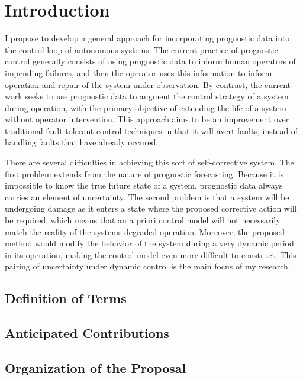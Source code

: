 \section{Introduction}
I propose to develop a general approach for incorporating prognostic
data into the control loop of autonomous systems.  The current
practice of prognostic control generally consists of using prognostic
data to inform human operators of impending failures, and then the
operator uses this information to inform operation and repair of the
system under observation.  By contrast, the current work seeks to use
prognostic data to augment the control strategy of a system during
operation, with the primary objective of extending the life of a
system without operator intervention.  This approach aims to be an
improvement over traditional fault tolerant control techniques in that
it will avert faults, instead of handling faults that have already
occured.

There are several difficulties in achieving this sort of
self-corrective system.  The first problem extends from the nature of
prognostic forecasting.  Because it is impossible to know the true
future state of a system, prognostic data always carries an element of
uncertainty.  The second problem is that a system will be undergoing
damage as it enters a state where the proposed corrective action will
be required, which means that an a priori control model will not
necessarily match the reality of the systems degraded operation.
Moreover, the proposed method would modify the behavior of the system
during a very dynamic period in its operation, making the control
model even more difficult to construct.  This pairing of uncertainty
under dynamic control is the main focus of my research.



\subsection{Definition of Terms}
\subsection{Anticipated Contributions}
\subsection{Organization of the Proposal}
